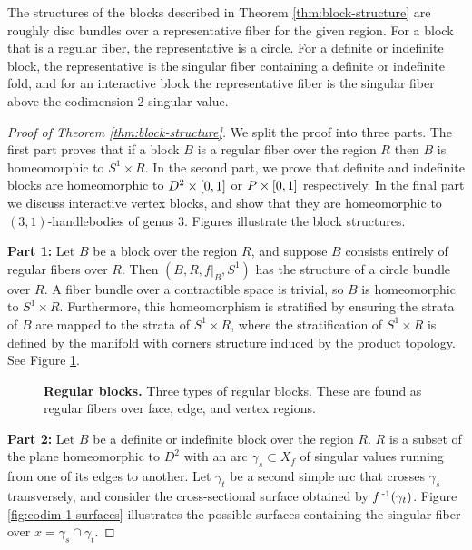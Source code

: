 \begin{rmk}
	The structures of the blocks described in Theorem \ref{thm:block-structure} are roughly disc bundles over a representative fiber for the given region.
	For a block that is a regular fiber, the representative is a circle.
	For a definite or indefinite block, the representative is the singular fiber containing a definite or indefinite fold, and for an interactive block the representative fiber is the singular fiber above the codimension 2 singular value.
\end{rmk}

\begin{proof}[Proof of Theorem \ref{thm:block-structure}]
	We split the proof into three parts.
	The first part proves that if a block $B$ is a regular fiber over the region $R$ then $B$ is homeomorphic to $S^1\times R$.
	In the second part, we prove that definite and indefinite blocks are homeomorphic to $D^2\times[0,1]$ or $P\times[0,1]$ respectively.
	In the final part we discuss interactive vertex blocks, and show that they are homeomorphic to $(3,1)$-handlebodies of genus 3.
	Figures illustrate the block structures.
	
	\textbf{Part 1:}
	Let $B$ be a block over the region $R$, and suppose $B$ consists entirely of regular fibers over $R$.
	Then $(B, R, f|_B, S^1)$ has the structure of a circle bundle over $R$.
	A fiber bundle over a contractible space is trivial, so $B$ is homeomorphic to $S^1 \times R$.
	Furthermore, this homeomorphism is stratified by ensuring the strata of $B$ are mapped to the strata of $S^1 \times R$, where the stratification of $S^1 \times R$ is defined by the manifold with corners structure induced by the product topology.
	See Figure \ref{fig:regular-blocks}.
	
	\begin{figure}[h!]
		\caption{
			\textbf{Regular blocks.}
			Three types of regular blocks.
			These are found as regular fibers over face, edge, and vertex regions.
		}
		\label{fig:regular-blocks}
	\end{figure}
	
	\textbf{Part 2:}
	Let $B$ be a definite or indefinite block over the region $R$.
	$R$ is a subset of the plane homeomorphic to $D^2$ with an arc $\gamma_s \subset X_f$ of singular values running from one of its edges to another.
	Let $\gamma_t$ be a second simple arc that crosses $\gamma_s$ transversely, and consider the cross-sectional surface obtained by $f^{\,\text{-}1}(\gamma_t)$.
	Figure \ref{fig:codim-1-surfaces} illustrates the possible surfaces containing the singular fiber over $x=\gamma_s\cap\gamma_t$.
	

\end{proof}
